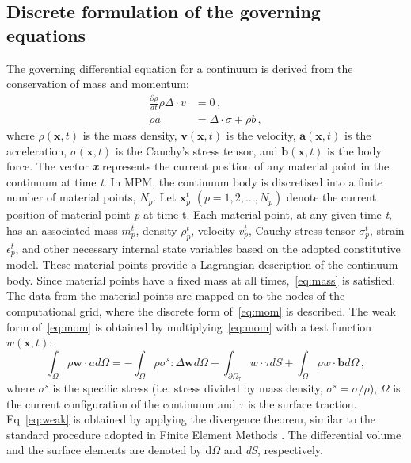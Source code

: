 \subsection{Discrete formulation of the governing equations}
The governing differential equation for a continuum is derived from the 
conservation of mass and momentum:
\begin{align}
\label{eq:mass}
\frac{\partial \rho}{dt}\rho \Delta \cdot \mathbf{\mathit{v}} & = 0 \,, \\   
 \label{eq:mom}
 \rho a & = \Delta \cdot \sigma + \rho \mathbf{\mathit{b}} \,,
\end{align}
where $\rho (\mathbf{x},t)$ is the mass density, $\mathit{\mathbf{v}} 
(\mathbf{x},t)$ is the velocity,  $\mathit{\mathbf{a}} (\mathbf{x},t)$ is the 
acceleration,  $\sigma (\mathbf{x},t)$ is the Cauchy's stress tensor, and  
$\mathit{\mathbf{b}} (\mathbf{x},t)$ is the body force. The vector 
\textbf{\textit{x}} represents the current position of any material point in 
the continuum at time \textit{t}. In MPM, the continuum body is discretised 
into a finite number of material points, $\mathit{N}_{p}$. Let 
$\mathit{\mathbf{x}}_{p}^{t}$ $(\mathit{p}=1,2,\dots,\mathit{N}_{p})$ denote 
the current position of material point \textit{p} at time t.
Each material point, at any given time \textit{t}, has an associated mass 
$\mathit{m}_{p}^{t}$, density $\rho_{p}^{t}$, velocity 
$\mathbf{\mathit{v}}_{p}^{t}$, Cauchy stress tensor $\sigma_{p}^{t}$, strain 
$\epsilon_{p}^{t}$, and other necessary internal state variables based on the 
adopted constitutive model. These material points provide a Lagrangian 
description of the continuum body. Since material points have a fixed mass at 
all times,~\cref{eq:mass} is satisfied. The data from the material points 
are mapped on to the nodes of the computational grid, where the discrete form 
of~\cref{eq:mom} is described. The weak form of~\cref{eq:mom} is 
obtained 
by multiplying~\cref{eq:mom} with a test function 
$\mathbf{\mathit{w}}(\mathbf{x},t)$:
\begin{equation}
\int_{\Omega}\rho \mathit{\mathbf{w}} \cdot \mathbf{\mathit{a}} 
\mathit{d}\Omega = - \int_{\Omega} \rho {\sigma}^{s} : \Delta 
\mathit{\mathbf{w}} \mathit{d}\Omega + \int_{{\partial \Omega}_{\tau}} 
\mathbf{\mathit{w}} \cdot \tau \mathit{d} \mathit{S} + \int_{\Omega}\rho 
\mathbf{\mathit{w}} \cdot \mathbf{b} \mathit{d} \Omega \,,
\label{eq:weak}
\end{equation}
where $\sigma^{s}$ is the specific stress (i.e. stress divided by mass density, 
$\sigma^{s} = \sigma / \rho$), $\Omega$ is the current configuration of the 
continuum and $\tau$ is the surface traction. Eq~\ref{eq:weak} is obtained by 
applying the divergence theorem, similar to the standard procedure adopted in 
Finite Element Methods \citep{Sulsky1994,Sulsky1995, Chen2002}. The 
differential volume and the surface elements are denoted by d$\Omega$ and 
\textit{dS}, respectively. 

